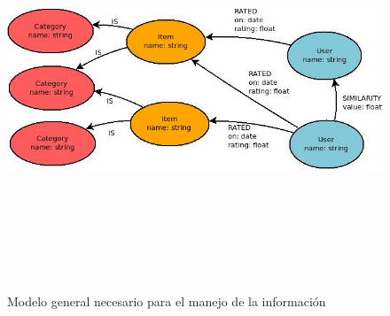 \newpage
    \begin{landscape}
      \begin{figure}[h!]
      \centering
      \includegraphics[width=22.5cm,height=12cm]{./images/Diagrama_general_datos.jpg}
      \caption{Modelo general necesario para el manejo de la información}
    \end{figure}
    \end{landscape}
  \newpage



